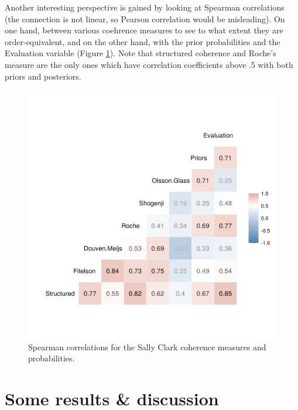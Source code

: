 \documentclass[10pt,]{scrartcl}
\begin{document}
Another interesting perspective is gained by looking at Spearman correlations (the connection is not linear, so Pearson correlation would be misleading). On one hand, between various coehrence measures to see to what extent they are order-equivalent, and on the other hand, with the prior probabilities and the Evaluation variable (Figure \ref{fig:spearman}).  Note that structured coherence and Roche's measure are the only ones which have correlation coefficients above .5 with both priors and posteriors. 



\begin{figure}[H]
    \includegraphics{../images/scSpearman.png}
    \caption{Spearman correlations for the Sally Clark coherence measures and probabilities.}
    \label{fig:spearman}
\end{figure}






\section{Some results \& discussion}\label{sec:discussion}

\begin{table}[H]
        \caption{Coherence scores in the Beatles scenario.}
    \label{tab:beatles}
\end{table}
\end{document}
